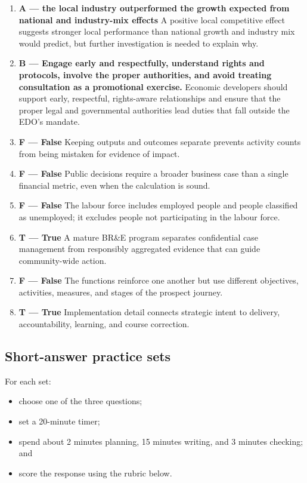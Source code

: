 \documentclass[11pt,letterpaper,oneside,openany]{book}
\begin{document}
\begin{enumerate}[leftmargin=*,itemsep=.8em]
\item \textbf{A --- the local industry outperformed the growth expected from national and industry-mix effects} A positive local competitive effect suggests stronger local performance than national growth and industry mix would predict, but further investigation is needed to explain why.
\item \textbf{B --- Engage early and respectfully, understand rights and protocols, involve the proper authorities, and avoid treating consultation as a promotional exercise.} Economic developers should support early, respectful, rights-aware relationships and ensure that the proper legal and governmental authorities lead duties that fall outside the EDO's mandate.
\item \textbf{F --- False} Keeping outputs and outcomes separate prevents activity counts from being mistaken for evidence of impact.
\item \textbf{F --- False} Public decisions require a broader business case than a single financial metric, even when the calculation is sound.
\item \textbf{F --- False} The labour force includes employed people and people classified as unemployed; it excludes people not participating in the labour force.
\item \textbf{T --- True} A mature BR\&E program separates confidential case management from responsibly aggregated evidence that can guide community-wide action.
\item \textbf{F --- False} The functions reinforce one another but use different objectives, activities, measures, and stages of the prospect journey.
\item \textbf{T --- True} Implementation detail connects strategic intent to delivery, accountability, learning, and course correction.
\end{enumerate}


\subsection[Short-answer practice sets]{Short-answer practice sets}
For each set:


\begin{itemize}
\item choose one of the three questions;
\item set a 20-minute timer;
\item spend about 2 minutes planning, 15 minutes writing, and 3 minutes checking; and
\item score the response using the rubric below.
\end{itemize}
\end{document}
